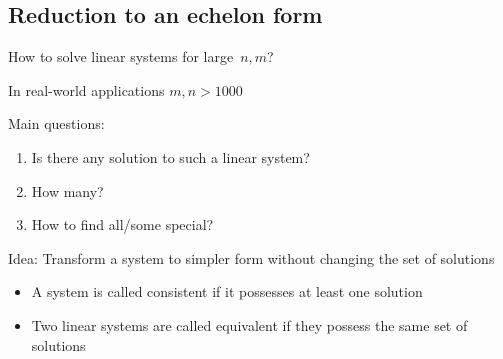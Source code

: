 \documentclass%
[handout]%
{beamer}
\begin{document}
\subsection{Reduction to an echelon form}

\begin{frame}[label=large-n]{How to solve linear systems for large~$n,m$?}

In real-world applications \alert{$m,n>1000$}

\begin{block}{Main questions:}
\begin{enumerate}
  \item Is there any solution to such a linear system?
  \item How many?
  \item How to find all/some special?
\end{enumerate}
\end{block}

\begin{block}{Idea:}
 Transform a system to simpler form without changing the set of solutions
\end{block}

\begin{definition}
\begin{itemize}
  \item A system is called \alert{consistent} if it possesses at least one solution
  \item Two linear systems are called \alert{equivalent} if they possess the same set of solutions
\end{itemize}
\end{definition}

\end{frame}
\end{document}
